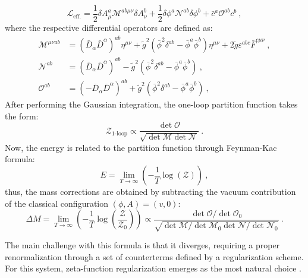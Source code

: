 \documentclass[a4paper,11pt]{article}
\begin{document}
\begin{equation}
    \mathcal{L}_{\text{eff.}} = \frac{1}{2} \delta A_\mu^a \mathcal{M}^{ab\mu\nu} \delta A_\nu^b + \frac{1}{2} \delta \phi^a \mathcal{N}^{ab} \delta \phi^b + \bar{c}^a { \mathcal{O}^{ab} } c^b\ ,\end{equation}
where the respective differential operators are defined as:
\begin{align}
    \mathcal{M}^{\mu\nu ab} &= (\bar{D}_\alpha \bar{D}^\alpha)^{ab} \eta^{\mu\nu} + \tilde{g}^2 (\bar{\phi}^2 \delta^{ab} - \bar{\phi}^a \bar{\phi}^b) \eta^{\mu\nu} + 2 \tilde{g} \varepsilon^{abc} \bar{F}^{c\mu\nu }\ , \\
\mathcal{N}^{ab} &= (\bar{D}_\alpha \bar{D}^\alpha)^{ab} - \tilde{g}^2 (\bar{\phi}^2 \delta^{ab} - \bar{\phi}^a \bar{\phi}^b)\ , \\
\mathcal{O}^{ab} &= (-\bar{D}_\alpha \bar{D}^\alpha)^{ab} + \tilde{g}^2 (\bar{\phi}^2 \delta^{ab} - \bar{\phi}^a \bar{\phi}^b)\ ,
\end{align}
After performing the Gaussian integration, the one-loop partition function takes the form:
\begin{equation}\mathcal Z_{\text{1-loop}} \propto \frac{\det \mathcal{O}}{\sqrt{\det \mathcal{M} \det \mathcal{N}}}\ .\end{equation}
Now, the energy is related to the partition function through Feynman-Kac formula:
\begin{equation}E = \lim_{T \to \infty} \left(-\frac{1}{T} \log(\mathcal Z)\right)\ ,\end{equation}
thus, the mass corrections are obtained by subtracting the vacuum contribution of the classical configuration $(\phi,A)=(v,0)$:
\begin{equation}\Delta M = \lim_{T \to \infty} \left( -\frac{1}{T} \log\left(\frac{\mathcal Z}{\mathcal Z_0}\right) \right) \propto \frac{\det \mathcal{O} /\det \mathcal{O}_0}{\sqrt{\det \mathcal{M} / \det \mathcal{M}_0 \det \mathcal{N} / \det \mathcal{N}_0}}\ .\end{equation}

The main challenge with this formula is that it diverges, requiring a proper renormalization through a set of counterterms defined by a regularization scheme. For this system, zeta-function regularization emerges as the most natural choice \cite{KiselevSelivanov1989}.
\end{document}
